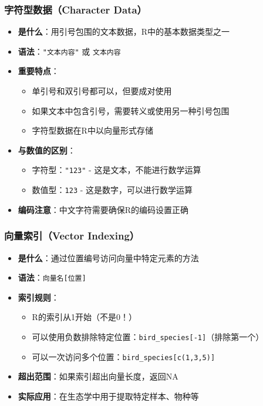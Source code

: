 \documentclass[
]{book}
\providecommand{\tightlist}{%
  \setlength{\itemsep}{0pt}\setlength{\parskip}{0pt}}
\begin{document}
\hypertarget{ux5b57ux7b26ux578bux6570ux636echaracter-data}{%
\subsubsection{字符型数据（Character Data）}\label{ux5b57ux7b26ux578bux6570ux636echaracter-data}}

\begin{itemize}
\tightlist
\item
  \textbf{是什么}：用引号包围的文本数据，R中的基本数据类型之一
\item
  \textbf{语法}：\texttt{"文本内容"} 或 \texttt{\textquotesingle{}文本内容\textquotesingle{}}
\item
  \textbf{重要特点}：

  \begin{itemize}
  \tightlist
  \item
    单引号和双引号都可以，但要成对使用
  \item
    如果文本中包含引号，需要转义或使用另一种引号包围
  \item
    字符型数据在R中以向量形式存储
  \end{itemize}
\item
  \textbf{与数值的区别}：

  \begin{itemize}
  \tightlist
  \item
    字符型：\texttt{"123"} - 这是文本，不能进行数学运算
  \item
    数值型：\texttt{123} - 这是数字，可以进行数学运算
  \end{itemize}
\item
  \textbf{编码注意}：中文字符需要确保R的编码设置正确
\end{itemize}

\hypertarget{ux5411ux91cfux7d22ux5f15vector-indexing}{%
\subsubsection{向量索引（Vector Indexing）}\label{ux5411ux91cfux7d22ux5f15vector-indexing}}

\begin{itemize}
\tightlist
\item
  \textbf{是什么}：通过位置编号访问向量中特定元素的方法
\item
  \textbf{语法}：\texttt{向量名{[}位置{]}}
\item
  \textbf{索引规则}：

  \begin{itemize}
  \tightlist
  \item
    R的索引从1开始（不是0！）
  \item
    可以使用负数排除特定位置：\texttt{bird\_species{[}-1{]}}（排除第一个）
  \item
    可以一次访问多个位置：\texttt{bird\_species{[}c(1,3,5){]}}
  \end{itemize}
\item
  \textbf{超出范围}：如果索引超出向量长度，返回NA
\item
  \textbf{实际应用}：在生态学中用于提取特定样本、物种等
\end{itemize}
\end{document}
